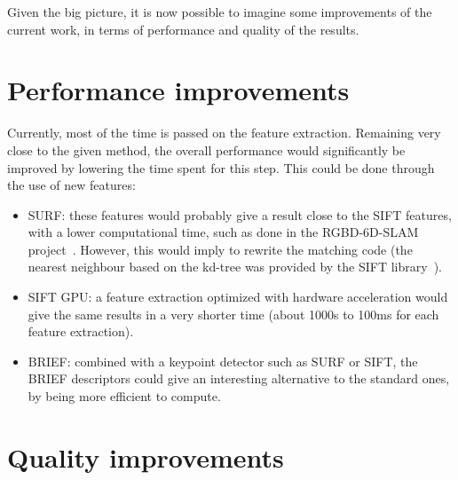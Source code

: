 Given the big picture, it is now possible to imagine some improvements of the current work, in terms of performance and quality of the results.

\section{Performance improvements}

Currently, most of the time is passed on the feature extraction. Remaining very close to the given method, the overall performance would significantly be improved by lowering the time spent for this step. This could be done through the use of new features:
\begin{itemize}
\item SURF: these features would probably give a result close to the SIFT features, with a lower computational time, such as done in the RGBD-6D-SLAM project~\cite{engelhard11euron-workshop}. However, this would imply to rewrite the matching code (the nearest neighbour based on the kd-tree was provided by the SIFT library~\cite{hess_sift}).
\item SIFT GPU: a feature extraction optimized with hardware acceleration would give the same results in a very shorter time (about 1000s to 100ms for each feature extraction).
\item BRIEF: combined with a keypoint detector such as SURF or SIFT, the BRIEF descriptors\cite{Calonder10-brief} could give an interesting alternative to the standard ones, by being more efficient to compute.
\end{itemize}

\section{Quality improvements}

